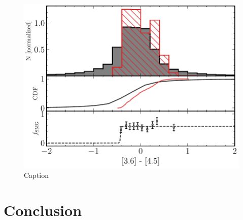 \begin{figure}
	\includegraphics[width=0.49\columnwidth, height=0.3\textheight]{Figures/3645_smg.pdf}
	\caption{{\color{red}Caption}}
	\label{fig:smg_nonsmg}
\end{figure}

\section{Conclusion}